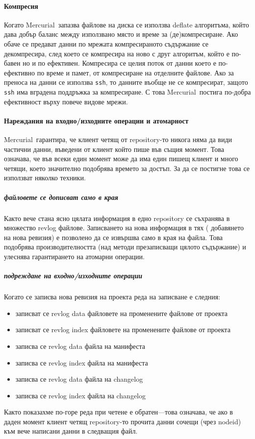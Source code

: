 \documentclass[a4paper]{article}
\def\Hg{Mercurial}
\begin{document}
    \paragraph{Компресия}
    Когато \Hg\ запазва файлове на диска се използва deflate\cite{deflate}
    алгоритъма, който дава добър баланс между използвано място и време за
    (де)компресиране. Ако обаче се предават данни по мрежата компресираното
    съдържание се декомпресира, след което се компресира на ново с друг
    алгоритъм, който е по-бавен но и по ефективен. Компресира се целия поток от
    данни което е по-ефективно по време и памет, от компресиране на отделните
    файлове. Ако за преноса на данни се използва \texttt{ssh}\cite{ssh}, то
    данните въобще не се компресират, защото \texttt{ssh} има вградена
    поддръжка за компресиране. С това \Hg\ постига по-добра ефективност върху
    повече видове мрежи.

    \paragraph{Нареждания на входно/изходните операции и атомарност}
    \Hg\ гарантира, че клиент четящ от repository-то никога няма да види
    частични данни, въведени от клиент който пише във същия момент. Това
    означава, че във всеки един момент може да има един пишещ клиент и много
    четящи, което значително подобрява времето за достъп. За да се постигне
    това се използват няколко техники.
      \subparagraph{файловете се дописват само в края}
      Както вече стана ясно цялата информация в едно repository се съхранява
      в множество revlog файлове. Записването на нова информация в тях (
      добавянето на нова ревизия) е позволено да се извършва само в края на
      файла. Това подобрява производителността (над методи презаписващи цялото
      съдържание) и улеснява гарантирането на атомарни операции.

      \subparagraph{подреждане на входно/изходните операции}
      Когато се записва нова ревизия на проекта реда на записване е следния:
      \begin{itemize}
        \item записват се revlog data файловете на променените файлове от проекта
        \item записват се revlog index файловете на променените файлове от проекта
        \item записва се revlog data файла на манифеста
        \item записва се revlog index файла на манифеста
        \item записва се revlog data файла на changelog
        \item записва се revlog index файла на changelog
      \end{itemize}
      Както показахме по-горе реда при четене е обратен---това означава, че ако
      в даден момент клиент четящ repository-то прочита данни сочещи (чрез
      nodeid) към вече написани данни в следващия файл.
\end{document}
